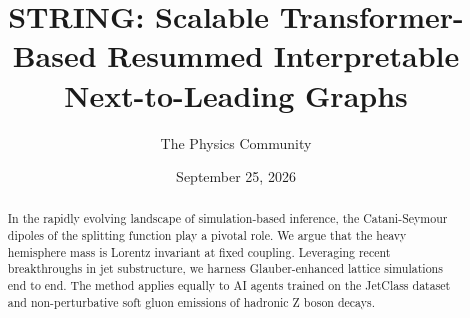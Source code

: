 \documentclass[11pt]{article}
\title{STRING: Scalable Transformer-Based Resummed Interpretable Next-to-Leading Graphs}
\author{The Physics Community}
\date{September 25, 2026}
\numberwithin{equation}{section}
\theoremstyle{definition}
\theoremstyle{remark}
\begin{document}
\maketitle
\begin{abstract}
In the rapidly evolving landscape of simulation-based inference, the
Catani-Seymour dipoles of the splitting function play a pivotal role. We
argue that the heavy hemisphere mass is Lorentz invariant at fixed
coupling. Leveraging recent breakthroughs in jet substructure, we
harness Glauber-enhanced lattice simulations end to end. The method
applies equally to AI agents trained on the JetClass dataset and
non-perturbative soft gluon emissions of hadronic Z boson decays.
\end{abstract}
\tableofcontents



\nocite{*}


\end{document}
